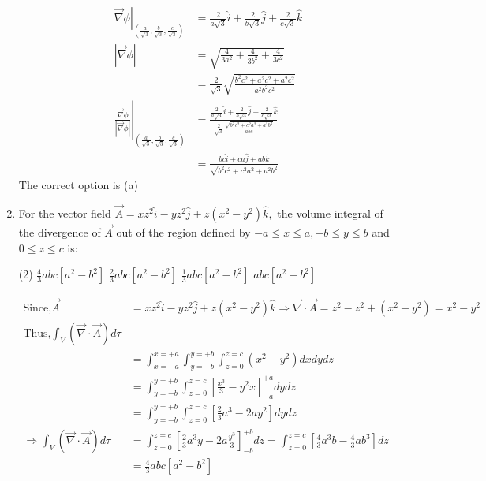 \begin{enumerate}[label=\color{ocre}\textbf{\arabic*.}]
\begin{answer}
\begin{align*}
	\left.\vec{\nabla} \phi\right|_{\left(\frac{a}{\sqrt{3}}, \frac{b}{\sqrt{3}}, \frac{c}{\sqrt{3}}\right)}&=\frac{2}{a \sqrt{3}} \hat{i}+\frac{2}{b \sqrt{3}} \hat{j}+\frac{2}{c \sqrt{3}} \hat{k}\\
	|\vec{\nabla} \phi|&=\sqrt{\frac{4}{3 a^{2}}+\frac{4}{3 b^{2}}+\frac{4}{3 c^{2}}}\\&=\frac{2}{\sqrt{3}} \sqrt{\frac{b^{2} c^{2}+a^{2} c^{2}+a^{2} c^{2}}{a^{2} b^{2} c^{2}}}\\
	\left.\frac{\vec{\nabla} \phi}{|\vec{\nabla} \phi|}\right|_{\left(\frac{a}{\sqrt{3}}, \frac{b}{\sqrt{3}}, \frac{c}{\sqrt{3}}\right)}&=\frac{\frac{2}{a \sqrt{3}} \hat{i}+\frac{2}{b \sqrt{3}} \hat{j}+\frac{2}{c \sqrt{3}} \hat{k}}{\frac{2}{\sqrt{3}} \frac{\sqrt{b^{2} c^{2}+c^{2} a^{2}+a^{2} b^{2}}}{a b c}}\\&=\frac{b c \hat{i}+c a \hat{j}+a b \hat{k}}{\sqrt{b^{2} c^{2}+c^{2} a^{2}+a^{2} b^{2}}}
	\end{align*}
The correct option is (a)
\end{answer}
\item For the vector field $\vec{A}=x z^{2} \hat{i}-y z^{2} \hat{j}+z\left(x^{2}-y^{2}\right) \hat{k},$ the volume integral of the divergence of $\vec{A}$
out of the region defined by $-a \leq x \leq a,-b \leq y \leq b$ and $0 \leq z \leq c$
is:
\begin{tasks}(2)
	\task[\textbf{a.}]$\frac{4}{3} a b c\left[a^{2}-b^{2}\right]$  
	\task[\textbf{b.}] $\frac{2}{3} a b c\left[a^{2}-b^{2}\right]$
	\task[\textbf{c.}]$\frac{1}{3} a b c\left[a^{2}-b^{2}\right]$ 
	\task[\textbf{d.}]$a b c\left[a^{2}-b^{2}\right]$ 
\end{tasks}
\begin{answer}
	\begin{align*}
	\text{Since,} \vec{A}&=x z^{2} \hat{i}-y z^{2} \hat{j}+z\left(x^{2}-y^{2}\right) \hat{k} \Rightarrow \vec{\nabla} \cdot \vec{A}=z^{2}-z^{2}+\left(x^{2}-y^{2}\right)=x^{2}-y^{2}\\
	\text{Thus,}\int_{V}(\vec{\nabla} \cdot \vec{A}) d \tau\\&=\int_{x=-a}^{x=+a} \int_{y=-b}^{y=+b} \int_{z=0}^{z=c}\left(x^{2}-y^{2}\right) d x d y d z\\&=\int_{y=-b}^{y=+b} \int_{z=0}^{z=c}\left[\frac{x^{3}}{3}-y^{2} x\right]_{-a}^{+a} d y d z\\&=\int_{y=-b}^{y=+b} \int_{z=0}^{z=c}\left[\frac{2}{3} a^{3}-2 a y^{2}\right] d y d z\\
	\Rightarrow \int_{V}(\vec{\nabla} \cdot \vec{A}) d \tau&=\int_{z=0}^{z=c}\left[\frac{2}{3} a^{3} y-2 a \frac{y^{3}}{3}\right]_{-b}^{+b} d z=\int_{z=0}^{z=c}\left[\frac{4}{3} a^{3} b-\frac{4}{3} a b^{3}\right] d z\\&=\frac{4}{3} a b c\left[a^{2}-b^{2}\right]

\end{align*}
\end{answer}
\end{enumerate}

